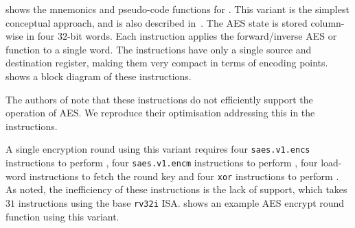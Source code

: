 
 shows the mnemonics and pseudo-code functions
for .
This variant is the simplest conceptual approach, and
is also described in~\cite[Section 4.2]{TilGro:06}.
The AES state is stored column-wise in four $32$-bit words.
Each instruction applies the forward/inverse AES  or
 function to a single word.
The instructions have only a single source and destination register,
making them very compact in terms of encoding points.
 shows a block diagram of these
instructions.

The authors of \cite{TilGro:06} note that these instructions do not
efficiently support the  operation of AES.  We reproduce their
optimisation addressing this in the  instructions.

A single encryption round using this variant requires
four {\tt saes.v1.encs} instructions to perform ,
four {\tt saes.v1.encm} instructions to perform ,
four load-word instructions to fetch the round key
and
four {\tt xor} instructions to perform .
As noted, the inefficiency of these instructions is the
lack of  support, which takes $31$ instructions using the
base {\tt rv32i} ISA.
 shows an example AES encrypt round function
using this variant.

